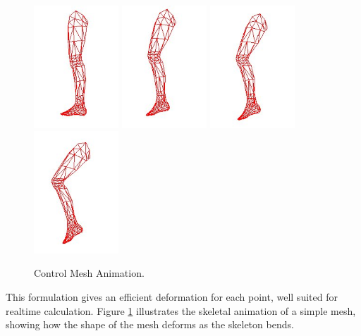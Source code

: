 \begin{figure}
\begin{center}
\includegraphics[width=3.18cm]{../images/low_leg_1}
\includegraphics[width=3.18cm]{../images/low_leg_2}
\includegraphics[width=3.18cm]{../images/low_leg_3}
\includegraphics[width=3.18cm]{../images/low_leg_4}
\caption[Control Mesh Animation]{\label{fig:controlmesh} Control Mesh Animation.}
\end{center}
\end{figure}
This formulation gives an efficient deformation for each point, well suited for realtime calculation. Figure \ref{fig:controlmesh} illustrates the skeletal animation of a simple mesh, showing how the shape of the mesh deforms as the skeleton bends.

